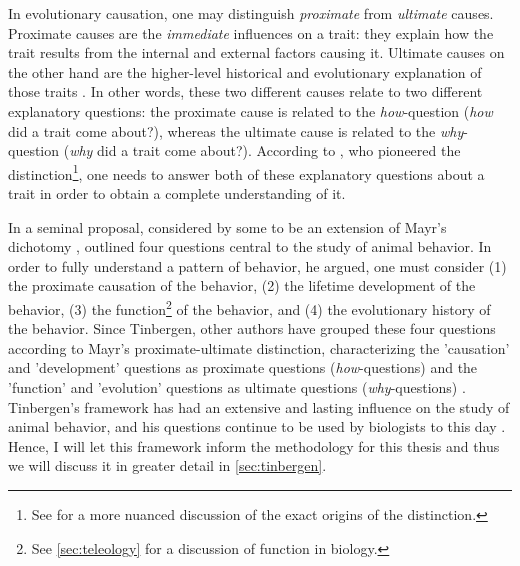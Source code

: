 In evolutionary causation, one may distinguish \emph{proximate} from \emph{ultimate} causes.
Proximate causes are the \emph{immediate} influences on a trait: they explain how the trait results from the internal and external factors causing it.
Ultimate causes on the other hand are the higher-level historical and evolutionary explanation of those traits \citep{Mayr61}. In other words, these two different causes relate to two different explanatory questions: the proximate cause is related to the \emph{how}-question (\emph{how} did a trait come about?), whereas the ultimate cause is related to the \emph{why}-question (\emph{why} did a trait come about?). According to \citet{Mayr61}, who pioneered the distinction\footnote{See \citep{Laland13} for a more nuanced discussion of the exact origins of the distinction.}, one needs to answer both of these explanatory questions about a trait in order to obtain a complete understanding of it.

In a seminal proposal, considered by some to be an extension of Mayr's dichotomy \citep{Laland13}, \citet{Tinbergen63} outlined four questions central to the study of animal behavior. In order to fully understand a pattern of behavior, he argued, one must consider (1) the proximate causation of the behavior, (2) the lifetime development of the behavior, (3) the function\footnote{See \cref{sec:teleology} for a discussion of function in biology.} of the behavior, and (4) the evolutionary history of the behavior.
Since Tinbergen, other authors have grouped these four questions according to Mayr's proximate-ultimate distinction, characterizing the 'causation' and 'development' questions as proximate questions (\emph{how}-questions) and the 'function' and 'evolution' questions as ultimate questions (\emph{why}-questions) \citep{BatesonLaland13, Laland13}.
Tinbergen's framework has had an extensive and lasting influence on the study of animal behavior, and his questions continue to be used by biologists to this day \citep{BatesonLaland13}. Hence, I will let this framework inform the methodology for this thesis and thus we will discuss it in greater detail in \cref{sec:tinbergen}.

